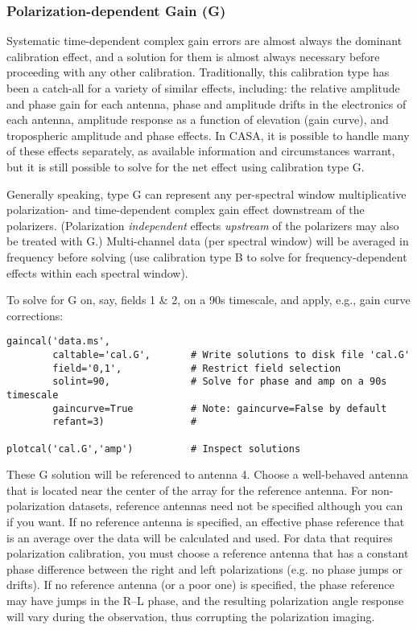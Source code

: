 \subsubsection{Polarization-dependent Gain (G)}
\label{section:cal.solve.gain.g}

Systematic time-dependent complex gain errors are almost always the
dominant calibration effect, and a solution for them is almost always
necessary before proceeding with any other calibration.
Traditionally, this calibration type has been a catch-all for a
variety of similar effects, including: the relative amplitude and
phase gain for each antenna, phase and amplitude drifts in the
electronics of each antenna, amplitude response as a function of
elevation (gain curve), and tropospheric amplitude and phase effects.
In CASA, it is possible to handle many of these effects separately, as
available information and circumstances warrant, but it is still
possible to solve for the net effect using calibration type G.

Generally speaking, type G can represent any per-spectral window
multiplicative polarization- and time-dependent complex gain effect
downstream of the polarizers.  (Polarization {\it independent} effects
{\it upstream} of the polarizers may also be treated with G.)
Multi-channel data (per spectral window) will be averaged in frequency
before solving (use calibration type B to solve for
frequency-dependent effects within each spectral window).

To solve for G on, say, fields 1 \& 2, on a 90s timescale, and apply,
e.g., gain curve corrections:
\small
\begin{verbatim}
gaincal('data.ms',
        caltable='cal.G',       # Write solutions to disk file 'cal.G'
        field='0,1',            # Restrict field selection
        solint=90,              # Solve for phase and amp on a 90s timescale
        gaincurve=True          # Note: gaincurve=False by default
        refant=3)               #
			        
plotcal('cal.G','amp')          # Inspect solutions
\end{verbatim}
\normalsize

These G solution will be referenced to antenna 4.  Choose a
well-behaved antenna that is located near the center of the array for
the reference antenna.  For non-polarization datasets, reference
antennas need not be specified although you can if you want.  If no
reference antenna is specified, an effective phase reference that is
an average over the data will be calculated and used.  For data that
requires polarization calibration, you must choose a reference antenna
that has a constant phase difference between the right and left
polarizations (e.g. no phase jumps or drifts).  If no reference
antenna (or a poor one) is specified, the phase reference may have
jumps in the R--L phase, and the resulting polarization angle response
will vary during the observation, thus corrupting the polarization
imaging.

